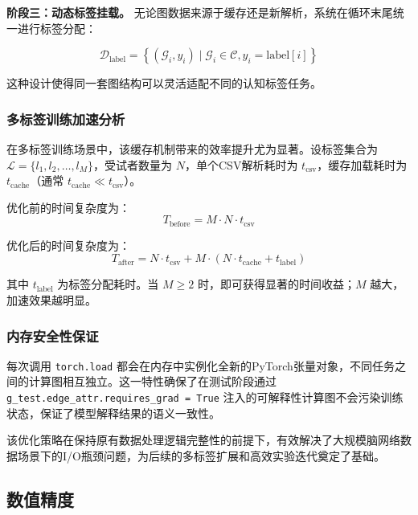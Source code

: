 \textbf{阶段三：动态标签挂载。} 无论图数据来源于缓存还是新解析，系统在循环末尾统一进行标签分配：

\begin{equation}
\mathcal{D}_{\text{label}} = \left\{ (\mathcal{G}_i, y_i) \mid \mathcal{G}_i \in \mathcal{C}, y_i = \text{label}[i] \right\}
\end{equation}

这种设计使得同一套图结构可以灵活适配不同的认知标签任务。

\subsubsection{多标签训练加速分析}

在多标签训练场景中，该缓存机制带来的效率提升尤为显著。设标签集合为 $\mathcal{L} = \{l_1, l_2, \ldots, l_M\}$，受试者数量为 $N$，单个CSV解析耗时为 $t_{\text{csv}}$，缓存加载耗时为 $t_{\text{cache}}$（通常 $t_{\text{cache}} \ll t_{\text{csv}}$）。

优化前的时间复杂度为：
\begin{equation}
T_{\text{before}} = M \cdot N \cdot t_{\text{csv}}
\end{equation}

优化后的时间复杂度为：
\begin{equation}
T_{\text{after}} = N \cdot t_{\text{csv}} + M \cdot (N \cdot t_{\text{cache}} + t_{\text{label}})
\end{equation}

其中 $t_{\text{label}}$ 为标签分配耗时。当 $M \geq 2$ 时，即可获得显著的时间收益；$M$ 越大，加速效果越明显。

\subsubsection{内存安全性保证}

每次调用 \texttt{torch.load} 都会在内存中实例化全新的PyTorch张量对象，不同任务之间的计算图相互独立。这一特性确保了在测试阶段通过 \texttt{g\_test.edge\_attr.requires\_grad = True} 注入的可解释性计算图不会污染训练状态，保证了模型解释结果的语义一致性。

该优化策略在保持原有数据处理逻辑完整性的前提下，有效解决了大规模脑网络数据场景下的I/O瓶颈问题，为后续的多标签扩展和高效实验迭代奠定了基础。

\subsection{数值精度}


